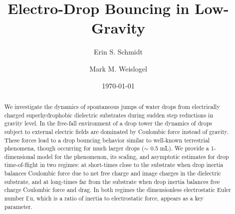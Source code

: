 \documentclass[aip,reprint, floatfix]{revtex4-1}
\begin{document}
\newcommand{\redline}{\raisebox{2pt}{\tikz{\draw[-,red,solid,line width = 1.5pt](0,0) -- (5mm,0);}}}
\graphicspath{ {../figures/} }

\newcommand{\blueline}{\raisebox{2pt}{\tikz{\draw[-,blue,solid,line width = 1.5pt](0,0) -- (5mm,0);}}}
\graphicspath{ {../figures/} }

\newcommand{\cyanline}{\raisebox{2pt}{\tikz{\draw[-,cyan,solid,line width = 1.5pt](0,0) -- (5mm,0);}}}
\graphicspath{ {../figures/} }


\title{Electro-Drop Bouncing in Low-Gravity} %



\author{Erin S. Schmidt}

\author{Mark M. Weislogel}


\date{\today}

\begin{abstract}

We investigate the dynamics of spontaneous jumps of water drops from electrically charged superhydrophobic dielectric substrates during sudden step reductions in gravity level. In the free-fall environment of a drop tower the dynamics of drops subject to external electric fields are dominated by Coulombic force instead of gravity. These forces lead to a drop bouncing behavior similar to well-known terrestrial phenomena, though occurring for much larger drops ($\sim$ 0.5 mL). We provide a 1-dimensional model for the phenomenon, its scaling, and asymptotic estimates for drop time-of-flight in two regimes: at short-times close to the substrate when drop inertia balances Coulombic force due to net free charge and image charges in the dielectric substrate, and at long-times far from the substrate when drop inertia balances free charge Coulombic force and drag. In both regimes the dimensionless electrostatic Euler number $\mathbb{E}\mbox{u}$, which is a ratio of inertia to electrostatic force, appears as a key parameter.
\end{abstract}
\end{document}
